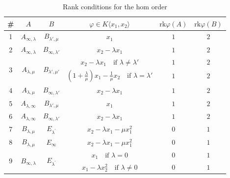 \documentclass[12pt]{amsart}
\newcommand{\field}{K}
\newcommand{\rank}{\mathrm{rk}}
\begin{document}
\begin{table}[ht]
\centering
\small
\caption{Rank conditions for the hom order}
\label{table:hom order}
\centering
{\renewcommand{\arraystretch}{2}
\setlength{\tabcolsep}{8pt}
\begin{tabular}{|c||c||c||c||c||c|}
\hline
\textbf{\#} & $A$ & $B$ & $\varphi\in \field\langle x_1, x_2\rangle$ & $\rank\varphi(A)$ & $\rank\varphi(B)$ \\
\hline\hline
1 & $A_{\infty, \lambda}$ & $B_{\lambda', \mu}$ & $x_1$ & $1$ & $2$\\
\hline\hline
2 & $A_{\infty, \lambda}$ & $B_{\infty, \lambda'}$ & $x_2 - \lambda x_1$ & $1$ & $2$ \\
\hline\hline
\multirow{2}{*}{3} &
\multirow{2}{*}{$A_{\lambda, \mu}$} & \multirow{2}{*}{$B_{\lambda', \mu'}$} & 
$ x_2 - \lambda x_1  \quad \text{if } \lambda \neq \lambda'$ & $1$ & $2$ \\
\cline{4-6}
& & & $(1 +\frac{\lambda}{\mu}) x_1 - \frac{1}{\mu} x_2 \quad \text{if } \lambda = \lambda'$ & $1$ & $2$ \\
\hline\hline
4 & $A_{\lambda, \mu}$ & $B_{\infty, \lambda'}$ & $x_2 - \lambda x_1$ & $1$ & $2$ \\
\hline\hline
5 & $A_{\lambda, \infty}$ & $B_{\lambda', \mu}$ & $x_1$ & $1$ & $2$ \\
\hline\hline
6 & $A_{\lambda, \infty}$ & $B_{\infty, \lambda'}$ & $x_2 - \lambda x_1$ & $1$ & $2$ \\
\hline\hline
7 & $B_{\lambda, \mu}$ & $E_{\lambda^{\prime}}$ & $x_2 - \lambda x_1 - \mu x_1^{2}$ & $0$ & $1$\\
\hline\hline
8 & $B_{\lambda, \mu}$ & $E_{\infty}$ & $x_2 - \lambda x_1 - \mu x_1^{2}$ & $0$ & $1$\\
\hline\hline
\multirow{2}{*}{9} &
\multirow{2}{*}{$B_{\infty, \lambda}$} & \multirow{2}{*}{$E_{\lambda^{\prime}}$} & 
$ x_1  \quad \text{if } \lambda = 0$ & $0$ & $1$ \\
\cline{4-6}
& & & $x_1 - \lambda x_2^{2} \quad \text{if } \lambda \neq 0$ & $0$ & $1$ \\
\hline
\end{tabular}
}
\end{table}

\newpage
\end{document}
